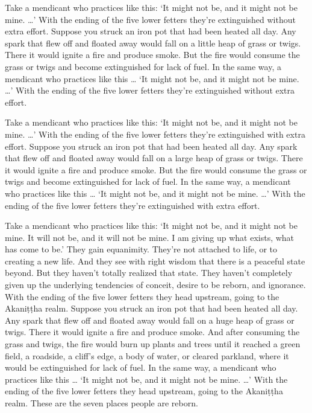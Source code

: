 \documentclass[12pt,openany]{book}%
\begin{document}
Take a mendicant who practices like this: ‘It might not be, and it might not be mine. …’ With the ending of the five lower fetters they’re extinguished without extra effort. Suppose you struck an iron pot that had been heated all day. Any spark that flew off and floated away would fall on a little heap of grass or twigs. There it would ignite a fire and produce smoke. But the fire would consume the grass or twigs and become extinguished for lack of fuel. In the same way, a mendicant who practices like this … ‘It might not be, and it might not be mine. …’ With the ending of the five lower fetters they’re extinguished without extra effort. 

Take a mendicant who practices like this: ‘It might not be, and it might not be mine. …’ With the ending of the five lower fetters they’re extinguished with extra effort. Suppose you struck an iron pot that had been heated all day. Any spark that flew off and floated away would fall on a large heap of grass or twigs. There it would ignite a fire and produce smoke. But the fire would consume the grass or twigs and become extinguished for lack of fuel. In the same way, a mendicant who practices like this … ‘It might not be, and it might not be mine. …’ With the ending of the five lower fetters they’re extinguished with extra effort. 

Take a mendicant who practices like this: ‘It might not be, and it might not be mine. It will not be, and it will not be mine. I am giving up what exists, what has come to be.’ They gain equanimity. They’re not attached to life, or to creating a new life. And they see with right wisdom that there is a peaceful state beyond. But they haven’t totally realized that state. They haven’t completely given up the underlying tendencies of conceit, desire to be reborn, and ignorance. With the ending of the five lower fetters they head upstream, going to the \textsanskrit{Akaniṭṭha} realm. Suppose you struck an iron pot that had been heated all day. Any spark that flew off and floated away would fall on a huge heap of grass or twigs. There it would ignite a fire and produce smoke. And after consuming the grass and twigs, the fire would burn up plants and trees until it reached a green field, a roadside, a cliff’s edge, a body of water, or cleared parkland, where it would be extinguished for lack of fuel. In the same way, a mendicant who practices like this … ‘It might not be, and it might not be mine. …’ With the ending of the five lower fetters they head upstream, going to the \textsanskrit{Akaniṭṭha} realm. These are the seven places people are reborn. 
\end{document}
